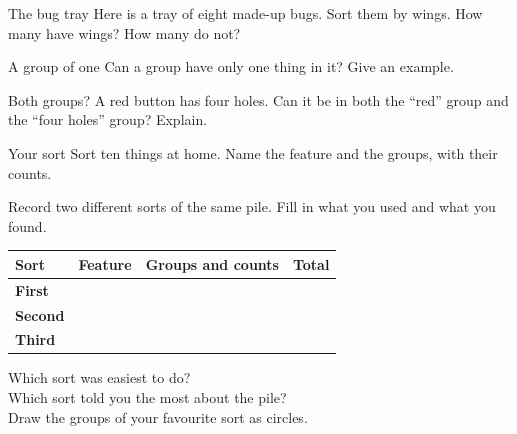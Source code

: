 \begin{puzzle}{The bug tray}
Here is a tray of eight made-up bugs. Sort them by wings. How many have wings? \wline[1.4cm] How many do not? \wline[1.4cm]
\bugtray
\end{puzzle}

\begin{puzzle}{A group of one}
Can a group have only one thing in it? \wline[2cm] Give an example. \wline[5cm]
\end{puzzle}

\begin{puzzle}{Both groups?}
A red button has four holes. Can it be in both the ``red'' group and the ``four holes'' group? Explain. \wline[6cm]
\end{puzzle}

\begin{puzzle}{Your sort}
Sort ten things at home. Name the feature and the groups, with their counts.\\
\wline[9cm]
\end{puzzle}
\clearpage
\thispagestyle{fancy}
Record two different sorts of the same pile. Fill in what you used and what you found.\par\medskip
\renewcommand{\arraystretch}{3.0}
\begin{tabularx}{\linewidth}{|>{\sffamily\small\bfseries}p{2.4cm}|X|X|X|}
\hline
Sort & Feature & Groups and counts & Total \\ \hline
First & & & \\ \hline
Second & & & \\ \hline
Third & & & \\ \hline
\end{tabularx}

\vspace{8pt}
Which sort was easiest to do? \wline[7cm]\\[10pt]
Which sort told you the most about the pile? \wline[6cm]\\[10pt]
Draw the groups of your favourite sort as circles.\par\medskip
{}
\clearpage
